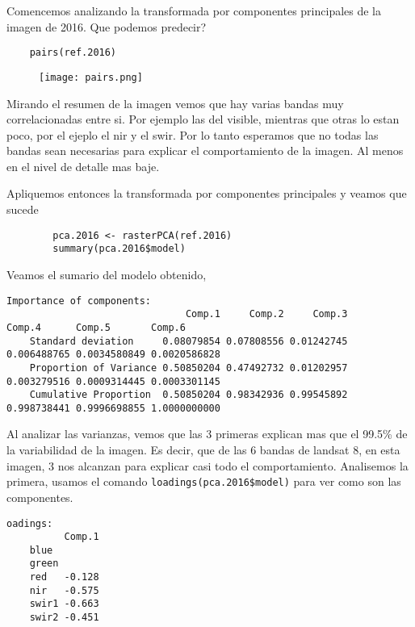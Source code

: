 \begin{exa}
    Comencemos analizando la transformada por componentes principales de la
    imagen de 2016. Que podemos predecir?
    \begin{lstlisting}
    pairs(ref.2016)
    \end{lstlisting}
    
    \begin{figure}
    \begin{center}
        \texttt{[image: pairs.png]}
    \end{center}
    \caption{}
    \label{fig:pairs}
    \end{figure}
    
    Mirando el resumen de la imagen vemos que hay varias bandas muy
    correlacionadas entre si. Por ejemplo las del visible, mientras que otras lo
    estan poco, por el ejeplo el nir y el swir. Por lo tanto esperamos que no
    todas las bandas sean necesarias para explicar el comportamiento de la
    imagen. Al menos en el nivel de detalle mas baje. 

    Apliquemos entonces la transformada por componentes principales y veamos que
    sucede

    \begin{lstlisting}
        pca.2016 <- rasterPCA(ref.2016)
        summary(pca.2016$model)
    \end{lstlisting}

    Veamos el sumario del modelo obtenido,
    \begin{Verbatim}[fontsize=\small]
    Importance of components:
                               Comp.1     Comp.2     Comp.3      Comp.4      Comp.5       Comp.6
    Standard deviation     0.08079854 0.07808556 0.01242745 0.006488765 0.0034580849 0.0020586828
    Proportion of Variance 0.50850204 0.47492732 0.01202957 0.003279516 0.0009314445 0.0003301145
    Cumulative Proportion  0.50850204 0.98342936 0.99545892 0.998738441 0.9996698855 1.0000000000
    \end{Verbatim}

    Al analizar las varianzas, vemos que las 3 primeras explican mas que el
    99.5\% de la variabilidad de la imagen. Es decir, que de las 6 bandas de
    landsat 8, en esta imagen, 3 nos alcanzan para explicar casi todo el
    comportamiento. Analisemos la primera, usamos el comando
    \texttt{loadings(pca.2016\$model)} para ver como son las componentes.

    \begin{Verbatim}[fontsize=\small]
    oadings:
          Comp.1 
    blue         
    green        
    red   -0.128 
    nir   -0.575             
    swir1 -0.663        
    swir2 -0.451        
    \end{Verbatim}


\end{exa}
